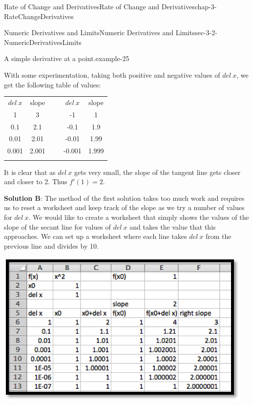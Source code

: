 \documentclass[oneside,10pt,]{book}
\newcommand{\terminology}[1]{\textbf{#1}}
\numberwithin{equation}{section}
\newcommand{\hrulethin}  {\noalign{\hrule height 0.04em}}
\newcommand{\hrulethick} {\noalign{\hrule height 0.11em}}
\begin{document}
\begin{chapterptx}{Rate of Change and Derivatives}{}{Rate of Change and Derivatives}{}{}{chap-3-RateChangeDerivatives}
\begin{sectionptx}{Numeric Derivatives and Limits}{}{Numeric Derivatives and Limits}{}{}{sec-3-2-NumericDerivativesLimits}
\begin{example}{A simple derivative at a point.}{example-25}
\begin{sidebyside}{1}{0.15}{0.15}{0}
\end{sidebyside}%
\par
\hypertarget{p-1025}{}%
With some experimentation, taking both positive and negative values of \(del\ x\), we get the following table of values:%
\begin{sidebyside}{1}{0}{0}{0}%
\begin{sbspanel}{1}%
{\centering%
\begin{tabular}{ccccc}\hrulethick
\(del\ x\)&slope&\(\ \ \ \)&\(del\ x\)&slope\tabularnewline\hrulethin
1&3&\(\ \ \ \)&-1&1\tabularnewline\hrulethin
0.1&2.1&\(\ \ \ \)&-0.1&1.9\tabularnewline\hrulethin
0.01&2.01&\(\ \ \ \)&-0.01&1.99\tabularnewline\hrulethin
0.001&2.001&\(\ \ \ \)&-0.001&1.999\tabularnewline\hrulethin
\end{tabular}
\par}
\end{sbspanel}%
\end{sidebyside}%
\par
\hypertarget{p-1026}{}%
It is clear that as \(del\ x\) gets very small, the slope of the tangent line gets closer and closer to 2.  Thus \(f'(1)=2\).%
\par
\hypertarget{p-1027}{}%
\terminology{Solution B}: The method of the first solution takes too much work and requires us to reset a worksheet and keep track of the slope as we try a number of values for \(del\ x\).  We would like to create a worksheet that simply shows the values of the slope of the secant line for values of \(del\ x\) and takes the value that this approaches.  We can set up a worksheet where each line takes \(del\ x\) from the previous line and divides by 10.%
\begin{sidebyside}{1}{0.15}{0.15}{0}%
\begin{sbspanel}{0.7}%
\includegraphics[width=1\linewidth]{images/sec3-2-4.png}

\end{sbspanel}
\end{sidebyside}
\end{example}
\end{sectionptx}
\end{chapterptx}
\end{document}
